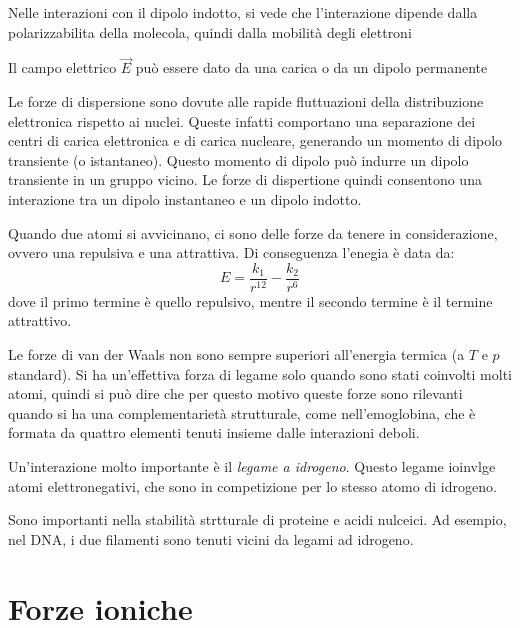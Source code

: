 Nelle interazioni con il dipolo indotto, si vede che l'interazione dipende dalla polarizzabilita della molecola, quindi dalla mobilità degli elettroni

Il campo elettrico $\vec{E}$ può essere dato da una carica o da un dipolo permanente

Le forze di dispersione sono dovute alle rapide fluttuazioni della distribuzione elettronica rispetto ai nuclei. Queste infatti comportano una separazione dei centri di carica elettronica e di carica nucleare, generando un momento di dipolo transiente (o istantaneo). Questo momento di dipolo può indurre un dipolo transiente in un gruppo vicino. Le forze di dispertione quindi consentono una interazione tra un dipolo instantaneo e un dipolo indotto.

Quando due atomi si avvicinano, ci sono delle forze da tenere in considerazione, ovvero una repulsiva e una attrattiva. Di conseguenza l'enegia è data da:
\[
  E = \frac{k_1}{r^{12}}-\frac{k_2}{r^6}
\]
dove il primo termine è quello repulsivo, mentre il secondo termine è il termine attrattivo.


Le forze di van der Waals non sono sempre superiori all'energia termica (a $T$ e $p$ standard). Si ha un'effettiva forza di legame solo quando sono stati coinvolti molti atomi, quindi si può dire che per questo motivo queste forze sono rilevanti quando si ha una complementarietà strutturale, come nell'emoglobina, che è formata da quattro elementi tenuti insieme dalle interazioni deboli.

Un'interazione molto importante è il \emph{legame a idrogeno}. Questo legame ioinvlge atomi elettronegativi, che sono in competizione per lo stesso atomo di idrogeno.

Sono importanti nella stabilità strtturale di proteine e acidi nulceici. Ad esempio, nel DNA, i due filamenti sono tenuti vicini da legami ad idrogeno.

\section{Forze ioniche}

